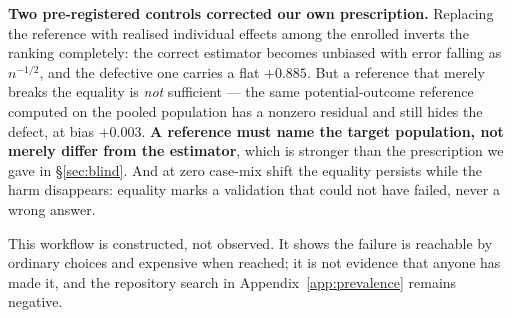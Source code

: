 \textbf{Two pre-registered controls corrected our own prescription.} Replacing
the reference with realised individual effects among the enrolled inverts the
ranking completely: the correct estimator becomes unbiased with error falling
as $n^{-1/2}$, and the defective one carries a flat $+0.885$. But a reference
that merely breaks the equality is \emph{not} sufficient --- the same
potential-outcome reference computed on the pooled population has a nonzero
residual and still hides the defect, at bias $+0.003$. \textbf{A reference must
name the target population, not merely differ from the estimator}, which is
stronger than the prescription we gave in \S\ref{sec:blind}. And at zero
case-mix shift the equality persists while the harm disappears: equality marks
a validation that could not have failed, never a wrong answer.

This workflow is constructed, not observed. It shows the failure is reachable
by ordinary choices and expensive when reached; it is not evidence that anyone
has made it, and the repository search in Appendix~\ref{app:prevalence} remains
negative.
